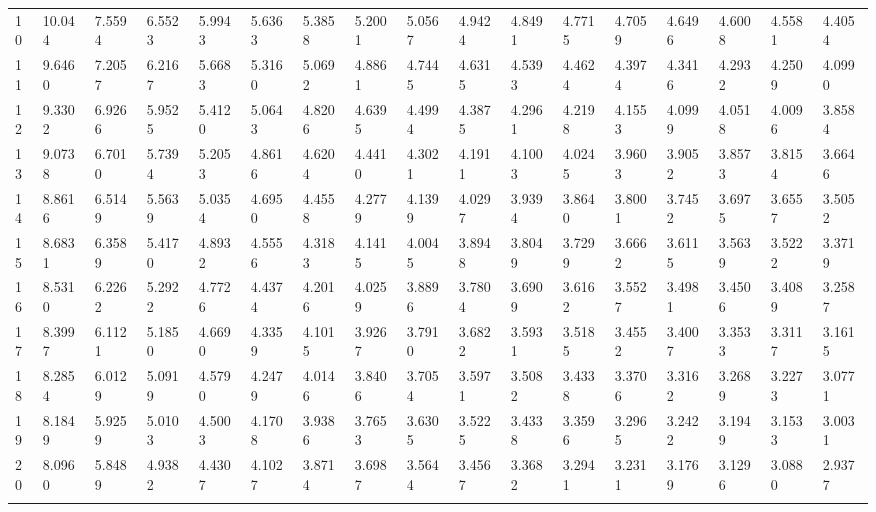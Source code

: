 {\begin{tabular}{|m{8pt}|m{18pt}*{15}{m{18pt}}}
 10 & 10.044 & 7.5594 & 6.5523 & 5.9943 & 5.6363 & 5.3858 & 5.2001 & 5.0567 & 4.9424 & 4.8491 & 4.7715 & 4.7059 & 4.6496 & 4.6008 & 4.5581 & 4.4054 \\[2pt] \arrayrulecolor{light-gray}\hline\arrayrulecolor{black}  
 11 & 9.6460 & 7.2057 & 6.2167 & 5.6683 & 5.3160 & 5.0692 & 4.8861 & 4.7445 & 4.6315 & 4.5393 & 4.4624 & 4.3974 & 4.3416 & 4.2932 & 4.2509 & 4.0990 \\[2pt] \arrayrulecolor{light-gray}\hline\arrayrulecolor{black}  
 12 & 9.3302 & 6.9266 & 5.9525 & 5.4120 & 5.0643 & 4.8206 & 4.6395 & 4.4994 & 4.3875 & 4.2961 & 4.2198 & 4.1553 & 4.0999 & 4.0518 & 4.0096 & 3.8584 \\[2pt] \arrayrulecolor{light-gray}\hline\arrayrulecolor{black}  
 13 & 9.0738 & 6.7010 & 5.7394 & 5.2053 & 4.8616 & 4.6204 & 4.4410 & 4.3021 & 4.1911 & 4.1003 & 4.0245 & 3.9603 & 3.9052 & 3.8573 & 3.8154 & 3.6646 \\[2pt] \arrayrulecolor{light-gray}\hline\arrayrulecolor{black}  
 14 & 8.8616 & 6.5149 & 5.5639 & 5.0354 & 4.6950 & 4.4558 & 4.2779 & 4.1399 & 4.0297 & 3.9394 & 3.8640 & 3.8001 & 3.7452 & 3.6975 & 3.6557 & 3.5052 \\[2pt] \arrayrulecolor{light-gray}\hline\arrayrulecolor{black}  
 15 & 8.6831 & 6.3589 & 5.4170 & 4.8932 & 4.5556 & 4.3183 & 4.1415 & 4.0045 & 3.8948 & 3.8049 & 3.7299 & 3.6662 & 3.6115 & 3.5639 & 3.5222 & 3.3719 \\[2pt] \arrayrulecolor{light-gray}\hline\arrayrulecolor{black}  
 16 & 8.5310 & 6.2262 & 5.2922 & 4.7726 & 4.4374 & 4.2016 & 4.0259 & 3.8896 & 3.7804 & 3.6909 & 3.6162 & 3.5527 & 3.4981 & 3.4506 & 3.4089 & 3.2587 \\[2pt] \arrayrulecolor{light-gray}\hline\arrayrulecolor{black}  
 17 & 8.3997 & 6.1121 & 5.1850 & 4.6690 & 4.3359 & 4.1015 & 3.9267 & 3.7910 & 3.6822 & 3.5931 & 3.5185 & 3.4552 & 3.4007 & 3.3533 & 3.3117 & 3.1615 \\[2pt] \arrayrulecolor{light-gray}\hline\arrayrulecolor{black}  
 18 & 8.2854 & 6.0129 & 5.0919 & 4.5790 & 4.2479 & 4.0146 & 3.8406 & 3.7054 & 3.5971 & 3.5082 & 3.4338 & 3.3706 & 3.3162 & 3.2689 & 3.2273 & 3.0771 \\[2pt] \arrayrulecolor{light-gray}\hline\arrayrulecolor{black}  
 19 & 8.1849 & 5.9259 & 5.0103 & 4.5003 & 4.1708 & 3.9386 & 3.7653 & 3.6305 & 3.5225 & 3.4338 & 3.3596 & 3.2965 & 3.2422 & 3.1949 & 3.1533 & 3.0031 \\[2pt] \arrayrulecolor{light-gray}\hline\arrayrulecolor{black}  
 20 & 8.0960 & 5.8489 & 4.9382 & 4.4307 & 4.1027 & 3.8714 & 3.6987 & 3.5644 & 3.4567 & 3.3682 & 3.2941 & 3.2311 & 3.1769 & 3.1296 & 3.0880 & 2.9377 \\[2pt] \arrayrulecolor{light-gray}\hline\arrayrulecolor{black}  

\end{tabular}}
